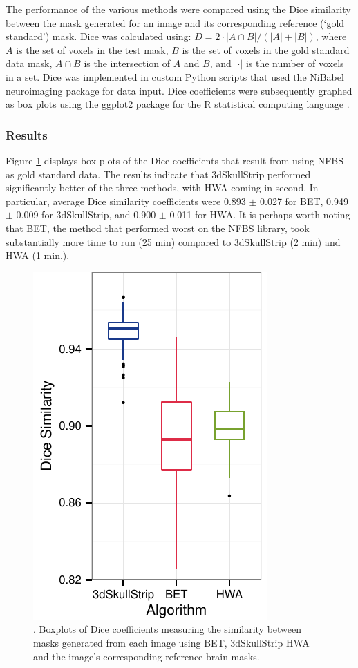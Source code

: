 \documentclass{bmcart}
\begin{document}
\par The performance of the various methods were compared using the Dice similarity \cite{Dice1945} between the mask generated for an image and its corresponding reference (`gold standard') mask. Dice was calculated using: $D = 2 \cdot | A \cap B | / (|A| + |B|)$, where $A$ is the set of voxels in the test mask, $B$ is the set of voxels in the gold standard data mask, $A \cap B$ is the intersection of $A$ and $B$, and $|\cdot|$ is the number of voxels in a set. Dice was implemented in custom Python scripts that used the NiBabel neuroimaging package \cite{NiBabel} for data input. Dice coefficients were subsequently graphed as box plots using the ggplot2 package \cite{ggplot} for the R statistical computing language \cite{R}.


\subsubsection*{Results}
Figure \ref{fig:boxplot_NFBS} displays box plots of the Dice coefficients that result from using NFBS as gold standard data. The results indicate that 3dSkullStrip performed significantly better of the three methods, with HWA coming in second. In particular, average Dice similarity coefficients were 0.893 $\pm$ 0.027 for BET, 0.949 $\pm$ 0.009 for 3dSkullStrip, and 0.900 $\pm$ 0.011 for HWA. It is perhaps worth noting that BET, the method that performed worst on the NFBS library, took substantially more time to run (25 min) compared to 3dSkullStrip (2 min) and HWA (1 min.). 

\begin{figure}[h!]
    \includegraphics[]{boxplot_nfbs.pdf}
    \caption{. Boxplots of Dice coefficients measuring the similarity between masks generated from each image using BET, 3dSkullStrip HWA and the image's corresponding reference brain masks. }
    \label{fig:boxplot_NFBS}
\end{figure}
\end{document}
